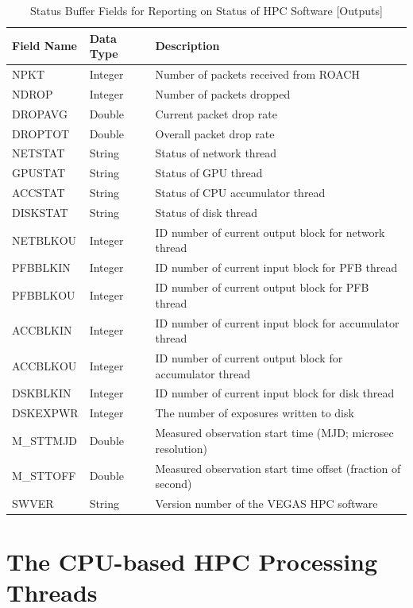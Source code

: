 \documentclass[11pt]{article} %
\begin{document}
\begin{table}[!h]
\centering
\caption{Status Buffer Fields for Reporting on Status of HPC Software [Outputs]}
\begin{tabular}{l l l}
\hline
\bf Field Name & \bf Data Type & \bf Description \\
\hline
NPKT & Integer & Number of packets received from ROACH \\ 
NDROP & Integer & Number of packets dropped \\ 
DROPAVG & Double & Current packet drop rate \\ 
DROPTOT & Double & Overall packet drop rate \\
NETSTAT & String & Status of network thread \\
GPUSTAT & String & Status of GPU thread \\
ACCSTAT & String & Status of CPU accumulator thread \\
DISKSTAT & String & Status of disk thread \\
NETBLKOU & Integer & ID number of current output block for network thread \\ 
PFBBLKIN & Integer & ID number of current input block for PFB thread \\ 
PFBBLKOU & Integer & ID number of current output block for PFB thread\\ 
ACCBLKIN & Integer & ID number of current input block for accumulator thread\\ 
ACCBLKOU & Integer & ID number of current output block for accumulator thread\\ 
DSKBLKIN & Integer & ID number of current input block for disk thread \\
DSKEXPWR & Integer & The number of exposures written to disk \\ 
M\_STTMJD & Double & Measured observation start time (MJD; microsec resolution)\\
M\_STTOFF & Double & Measured observation start time offset (fraction of second) \\
SWVER & String & Version number of the VEGAS HPC software \\
\hline
\end{tabular}
\label{status-buffer-monitor}
\end{table}



\clearpage
\section{The CPU-based HPC Processing Threads}
\end{document}
